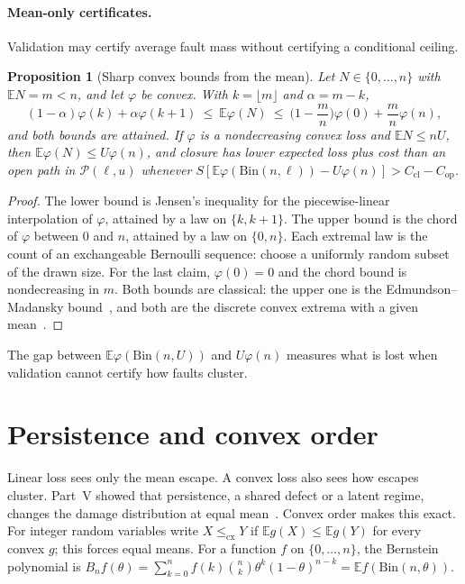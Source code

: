 \documentclass[11pt]{article}
\newtheorem{proposition}[theorem]{Proposition}
\theoremstyle{definition}
\theoremstyle{remark}
\newcommand{\E}{\mathbb E}
\newcommand{\Bin}{\mathrm{Bin}}
\newcommand{\cx}{\le_{\mathrm{cx}}}
\begin{document}
\paragraph{Mean-only certificates.}
Validation may certify average fault mass without certifying a conditional ceiling.

\begin{proposition}[Sharp convex bounds from the mean]\label{prop:meanonly}
Let $N\in\{0,\dots,n\}$ with $\E N=m<n$, and let $\varphi$ be convex. With $k=\lfloor m\rfloor$ and
$\alpha=m-k$,
\[
(1-\alpha)\varphi(k)+\alpha\varphi(k+1)\ \le\ \E\varphi(N)\ \le\ \Big(1-\frac mn\Big)\varphi(0)+\frac mn\varphi(n),
\]
and both bounds are attained. If $\varphi$ is a nondecreasing convex loss and $\E N\le nU$, then
$\E\varphi(N)\le U\varphi(n)$, and closure has lower expected loss plus cost than an open path in
$\mathcal P(\ell,u)$ whenever $S[\E\varphi(\Bin(n,\ell))-U\varphi(n)]>C_{\mathrm{cl}}-C_{\mathrm{op}}$.
\end{proposition}
\begin{proof}
The lower bound is Jensen's inequality for the piecewise-linear interpolation of $\varphi$, attained
by a law on $\{k,k+1\}$. The upper bound is the chord of $\varphi$ between $0$ and $n$, attained by a
law on $\{0,n\}$. Each extremal law is the count of an exchangeable Bernoulli sequence: choose a
uniformly random subset of the drawn size. For the last claim, $\varphi(0)=0$ and the chord bound is
nondecreasing in $m$. Both bounds are classical: the upper one is the Edmundson--Madansky
bound~\cite{madansky59}, and both are the discrete convex extrema with a given mean~\cite{denuit97}.
\end{proof}
The gap between $\E\varphi(\Bin(n,U))$ and $U\varphi(n)$ measures what is lost when validation
cannot certify how faults cluster.

\section{Persistence and convex order}\label{sec:convex}
Linear loss sees only the mean escape. A convex loss also sees how escapes cluster. Part~V showed
that persistence, a shared defect or a latent regime, changes the damage distribution at equal
mean~\cite{p5}. Convex order makes this exact. For integer random variables write $X\cx Y$ if
$\E g(X)\le\E g(Y)$ for every convex $g$; this forces equal means. For a function $f$ on
$\{0,\dots,n\}$, the Bernstein polynomial is
$B_nf(\theta)=\sum_{k=0}^nf(k)\binom nk\theta^k(1-\theta)^{n-k}=\E f(\Bin(n,\theta))$.
\end{document}
